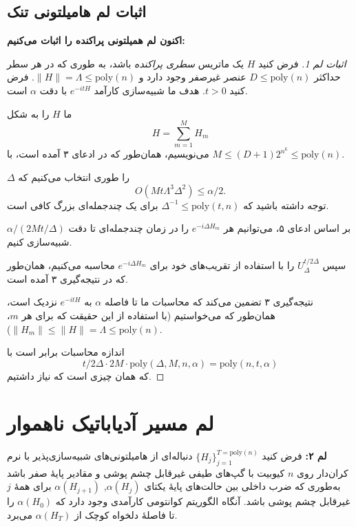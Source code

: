 \subsection{ اثبات لم هامیلتونی تنک}
\textbf{اکنون لم همیلتونی پراکنده را اثبات می‌کنیم:}  
\begin{proof}[اثبات لم 1]
	فرض کنید $H$ یک ماتریس \emph{سطری پراکنده} باشد، به طوری که در هر سطر حداکثر $D \le \text{poly}(n)$ عنصر غیرصفر وجود دارد و $\|H\| = \Lambda \le \text{poly}(n)$.  
	فرض کنید $t > 0$. هدف ما شبیه‌سازی کارآمد $e^{-i t H}$ با دقت $\alpha$ است.  
	
	ما $H$ را به شکل  
	\[
	H = \sum_{m=1}^{M} H_m
	\]  
	می‌نویسیم، همان‌طور که در ادعای ۳ آمده است، با $M \le (D+1)2^{n^6} \le \text{poly}(n)$.  
	
	$\Delta$ را طوری انتخاب می‌کنیم که  
	\[
	O(M t \Lambda^3 \Delta^2) \le \alpha/2.
	\]  
	توجه داشته باشید که $\Delta^{-1} \le \text{poly}(t, n)$ برای یک چندجمله‌ای بزرگ کافی است.  
	
	بر اساس ادعای ۵، می‌توانیم هر $e^{-i \Delta H_m}$ را در زمان چندجمله‌ای تا دقت  
	$\alpha / (2 M t / \Delta)$ شبیه‌سازی کنیم.  
	
	سپس 
	$U_{\Delta}^{t/2\Delta}$
	 را با استفاده از تقریب‌های خود برای $e^{-i \Delta H_m}$ محاسبه می‌کنیم، همان‌طور که در نتیجه‌گیری ۳ آمده است.  
	
	نتیجه‌گیری ۳ تضمین می‌کند که محاسبات ما تا فاصله $\alpha$ به $e^{-i t H}$ نزدیک است، همان‌طور که می‌خواستیم (با استفاده از این حقیقت که برای هر $m$، $\|H_m\| \le \|H\| = \Lambda \le \text{poly}(n)$).  
	
	اندازه محاسبات برابر است با  
	\[
	t/2\Delta  \cdot 2 M \cdot \text{poly}(\Delta, M, n, \alpha) = \text{poly}(n, t, \alpha)
	\]  
	که همان چیزی است که نیاز داشتیم.
\end{proof}


\section{ لم مسیر آدیاباتیک ناهموار‌}

\textbf{لم ۲:}
 فرض کنید $\{H_j\}_{j=1}^{T=\mathrm{poly}(n)}$ دنباله‌ای از هامیلتونی‌های شبیه‌سازی‌پذیر با نرم کران‌دار روی $n$ کیوبیت با گپ‌های طیفی غیرقابل چشم پوشی و مقادیر پایهٔ صفر باشد به‌طوری که ضرب داخلی بین حالت‌های پایهٔ یکتای $\alpha(H_j)$, $\alpha(H_{j+1})$ برای همهٔ $j$ غیرقابل چشم پوشی باشد. آنگاه الگوریتم کوانتومی کارآمدی وجود دارد که $\alpha(H_0)$ را تا فاصلهٔ دلخواه کوچک از $\alpha(H_T)$ می‌برد. 


